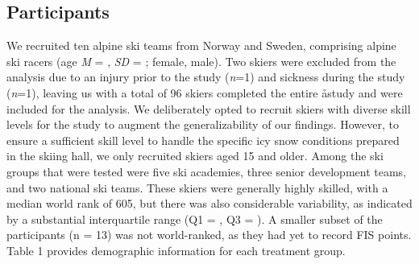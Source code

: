\documentclass{article}
\begin{document}
\subsection{Participants}
We recruited ten alpine ski teams from Norway and Sweden, comprising
alpine ski racers (age \textit{M} = , \textit{SD }= ;   female,   male). Two skiers were excluded from the analysis due to an injury prior to the study (\textit{n}=1) and sickness during the study (\textit{n}=1), leaving us with a total of 96 skiers completed the entire åstudy and were included for the analysis. We deliberately opted to recruit skiers with diverse skill levels for the study to augment the generalizability of our findings. However, to ensure a sufficient skill level to handle the specific icy snow conditions prepared in the skiing hall, we only recruited skiers aged 15 and older. Among the ski groups that were tested were five ski academies, three senior development teams, and two national ski teams. These skiers were generally highly skilled, with a median world rank of 605, but there was also considerable variability, as indicated by a substantial interquartile range (Q1 = , Q3 = ). A smaller subset of the participants (n = 13) was not world-ranked, as they had yet to record FIS points. Table 1 provides demographic information for each treatment group.
\end{document}
